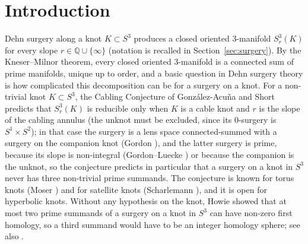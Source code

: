 \documentclass[11pt]{article}
\newcommand{\Q}{\mathbb Q}
\newcommand{\Surg}[2]{S^3_{#1}(#2)}
\theoremstyle{definition}
\theoremstyle{remark}
\begin{document}
\begin{abstract}
An \(L\)-space knot is a knot in \(S^3\) with a non-trivial Dehn surgery
whose Heegaard Floer homology is as small as its first homology allows.
We show that every Dehn surgery on an \(L\)-space knot has at most two
non-trivial prime summands. The proof combines published results on
reducible surgeries (\(L\)-space knots are fibered, by Ni; a reducible
surgery on a hyperbolic knot with a positive \(L\)-space surgery has slope
\(2g-1\), by Hom--Lidman--Zufelt; the Cabling Conjecture holds for
non-trivial non-hyperbolic knots, by Moser and Scharlemann; Gordon's
formula for
surgery on a cable; the Gordon--Luecke theorem on non-integral surgeries)
with an elementary group-theoretic obstruction: if a \(p/q\)-surgery on a
fibered knot of genus \(g\) has a non-trivial integer homology sphere
summand, then \(|p|\le g\). The obstruction is proved by estimating the
minimal number of generators of the commutator subgroup of the
fundamental group in two ways, through the universal abelian cover and
Grushko's theorem on free products on one side and through the
fundamental group of the fiber surface on the other.
\end{abstract}

\section{Introduction}\label{sec:intro}

Dehn surgery along a knot \(K\subset S^3\) produces a closed oriented
\(3\)-manifold \(\Surg{r}{K}\) for every slope
\(r\in\Q\cup\{\infty\}\) (notation is recalled in
Section~\ref{sec:surgery}). By the Kneser--Milnor theorem, every closed
oriented \(3\)-manifold is a connected sum of prime manifolds, unique up to
order, and a basic question in Dehn surgery theory is how complicated this
decomposition can be for a surgery on a knot. For a non-trivial knot
\(K\subset S^3\), the Cabling Conjecture of Gonz\'alez-Acu\~na and Short
\cite{GAS1986} predicts that \(\Surg{r}{K}\) is reducible only when
\(K\) is a cable knot and \(r\) is the slope of the cabling annulus (the
unknot must be excluded, since its \(0\)-surgery is \(S^1\times S^2\)); in
that case the surgery is a lens space connected-summed
with a surgery on the companion knot (Gordon \cite{Gordon1983}), and the
latter surgery is prime, because its slope is non-integral (Gordon--Luecke
\cite{GordonLuecke1987}) or because the companion is the unknot, so the
conjecture predicts in particular that a
surgery on a knot in \(S^3\) never has three non-trivial prime summands.
The conjecture is known for
torus knots (Moser \cite{Moser1971}) and for satellite knots (Scharlemann
\cite{Scharlemann1990}), and it is open for hyperbolic knots. Without any
hypothesis on the knot, Howie \cite{Howie2002} showed that at most two
prime summands of a surgery on a knot in \(S^3\) can have non-zero first
homology, so a third summand would have to be an integer homology sphere;
see also \cite{Howie2010}.
\end{document}
